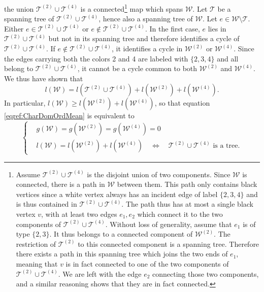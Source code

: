 \documentclass[aps,prd,10pt,notitlepage,nofootinbib,superscriptaddress,showkeys,showpacs]{revtex4-1}
\begin{document}
the union ${\mathcal{T}}^{(2)}\cup{\mathcal{T}}^{(4)}$ is a connected\footnote{Assume ${\mathcal{T}}^{(2)}\cup {\mathcal{T}}^{(4)}$ is the disjoint union of two components. Since ${\mathcal{W}}$ is connected, there is a path in ${\mathcal{W}}$ between them. This path only contains black vertices since a white vertex always has an incident edge of label $\{2, 3, 4\}$ and is thus contained in ${\mathcal{T}}^{(2)}\cup {\mathcal{T}}^{(4)}$. The path thus has at most a single black vertex $v$, with at least two edges $e_1, e_2$ which connect it to the two components of ${\mathcal{T}}^{(2)}\cup {\mathcal{T}}^{(4)}$. Without loss of generality, assume that $e_1$ is of type $\{2, 3\}$. It thus belongs to a connected component of ${\mathcal{W}}^{(2)}$. The restriction of ${\mathcal{T}}^{(2)}$ to this connected component is a spanning tree. Therefore there exists a path in this spanning tree which joins the two ends of $e_1$, meaning that $v$ is in fact connected to one of the two components of ${\mathcal{T}}^{(2)}\cup{\mathcal{T}}^{(4)}$. We are left with the edge $e_2$ connecting those two components, and a similar reasoning shows that they are in fact connected.} map which spans ${\mathcal{W}}$. Let ${\mathcal{T}}$ be a spanning tree of ${\mathcal{T}}^{(2)}\cup {\mathcal{T}}^{(4)}$, hence also a spanning tree of ${\mathcal{W}}$. Let $e\in {\mathcal{W}}\setminus {\mathcal{T}}$. Either $e\in {\mathcal{T}}^{(2)}\cup{\mathcal{T}}^{(4)}$ or $e\not\in {\mathcal{T}}^{(2)}\cup{\mathcal{T}}^{(4)}$. In the first case, $e$ lies in ${\mathcal{T}}^{(2)}\cup {\mathcal{T}}^{(4)}$ but not in its spanning tree and therefore identifies a cycle of ${\mathcal{T}}^{(2)}\cup{\mathcal{T}}^{(4)}$. If $e\not\in{\mathcal{T}}^{(2)}\cup{\mathcal{T}}^{(4)}$, it identifies a cycle in ${\mathcal{W}}^{(2)}$ or ${\mathcal{W}}^{(4)}$. Since the edges carrying both the colors 2 and 4 are labeled with $\{2,3,4\}$ and all belong to ${\mathcal{T}}^{(2)}\cup{\mathcal{T}}^{(4)}$, it cannot be a cycle common to both ${\mathcal{W}}^{(2)}$ and ${\mathcal{W}}^{(4)}$. We thus have shown that
\begin{equation}
l({\mathcal{W}})=l({\mathcal{T}}^{(2)}\cup{\mathcal{T}}^{(4)})+l({\mathcal{W}}^{(2)})+l({\mathcal{W}}^{(4)}).
\end{equation}
In particular, $l({\mathcal{W}})\geq l({\mathcal{W}}^{(2)})+l({\mathcal{W}}^{(4)})$, so that equation \eqref{eqref:CharDomOrdMean} is equivalent to 
\begin{equation}
\label{eqref:CharDomOrdMean2}
\left\{
\begin{aligned}
&g({\mathcal{W}})=g({\mathcal{W}}^{(2)})=g({\mathcal{W}}^{(4)})=0\\
&l({\mathcal{W}})= l({\mathcal{W}}^{(2)})+l({\mathcal{W}}^{(4)})\quad \Leftrightarrow \quad \text{${\mathcal{T}}^{(2)}\cup{\mathcal{T}}^{(4)}$ is a tree.}
\end{aligned}
\right.
\end{equation}
\end{document}
